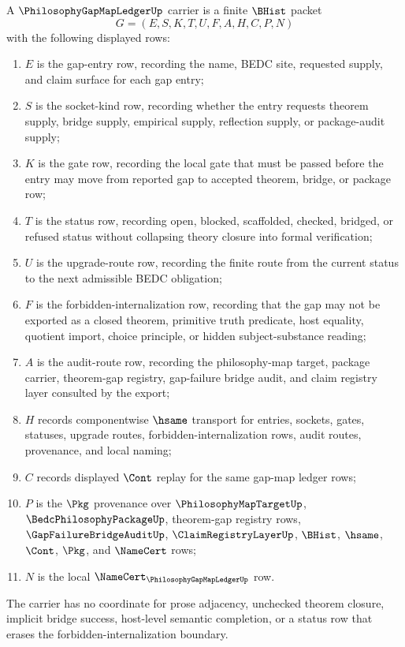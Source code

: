 \begin{definition}
\label{def:philosophy-gap-map-ledger-carrier}
A $\PhilosophyGapMapLedgerUp$ carrier is a finite $\BHist$ packet
$$
G=(E,S,K,T,U,F,A,H,C,P,N)
$$
with the following displayed rows:
\begin{enumerate}
\item $E$ is the gap-entry row, recording the name, BEDC site, requested supply, and claim surface for each gap entry;
\item $S$ is the socket-kind row, recording whether the entry requests theorem supply, bridge supply, empirical supply, reflection supply, or package-audit supply;
\item $K$ is the gate row, recording the local gate that must be passed before the entry may move from reported gap to accepted theorem, bridge, or package row;
\item $T$ is the status row, recording open, blocked, scaffolded, checked, bridged, or refused status without collapsing theory closure into formal verification;
\item $U$ is the upgrade-route row, recording the finite route from the current status to the next admissible BEDC obligation;
\item $F$ is the forbidden-internalization row, recording that the gap may not be exported as a closed theorem, primitive truth predicate, host equality, quotient import, choice principle, or hidden subject-substance reading;
\item $A$ is the audit-route row, recording the philosophy-map target, package carrier, theorem-gap registry, gap-failure bridge audit, and claim registry layer consulted by the export;
\item $H$ records componentwise $\hsame$ transport for entries, sockets, gates, statuses, upgrade routes, forbidden-internalization rows, audit routes, provenance, and local naming;
\item $C$ records displayed $\Cont$ replay for the same gap-map ledger rows;
\item $P$ is the $\Pkg$ provenance over $\PhilosophyMapTargetUp$, $\BedcPhilosophyPackageUp$, theorem-gap registry rows, $\GapFailureBridgeAuditUp$, $\ClaimRegistryLayerUp$, $\BHist$, $\hsame$, $\Cont$, $\Pkg$, and $\NameCert$ rows;
\item $N$ is the local $\NameCert_{\PhilosophyGapMapLedgerUp}$ row.
\end{enumerate}
The carrier has no coordinate for prose adjacency, unchecked theorem closure, implicit bridge success, host-level semantic completion, or a status row that erases the forbidden-internalization boundary.
\end{definition}

